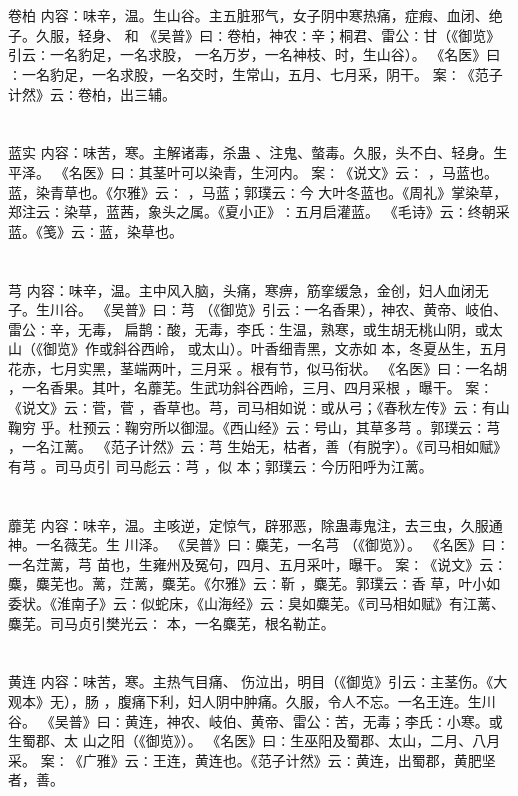 \documentclass[12pt,UTF8]{ctexbook}
\begin{document}
\chapter{}卷柏
内容：味辛，温。生山谷。主五脏邪气，女子阴中寒热痛，症瘕、血闭、绝子。久服，轻身、 
和 
《吴普》曰∶卷柏，神农∶辛；桐君、雷公∶甘（《御览》引云∶一名豹足，一名求股， 
一名万岁，一名神枝、时，生山谷）。 
《名医》曰∶一名豹足，一名求股，一名交时，生常山，五月、七月采，阴干。 
案∶《范子计然》云∶卷柏，出三辅。 


\chapter{}蓝实
内容：味苦，寒。主解诸毒，杀蛊 、注鬼、螫毒。久服，头不白、轻身。生平泽。 
《名医》曰∶其茎叶可以染青，生河内。 
案∶《说文》云∶ ，马蓝也。蓝，染青草也。《尔雅》云∶ ，马蓝；郭璞云∶今 
大叶冬蓝也。《周礼》掌染草，郑注云∶染草，蓝茜，象头之属。《夏小正》∶五月启灌蓝。 
《毛诗》云∶终朝采蓝。《笺》云∶蓝，染草也。 


\chapter{}芎
内容：味辛，温。主中风入脑，头痛，寒痹，筋挛缓急，金创，妇人血闭无子。生川谷。 
《吴普》曰∶芎 （《御览》引云∶一名香果），神农、黄帝、岐伯、雷公∶辛，无毒， 
扁鹊∶酸，无毒，李氏∶生温，熟寒，或生胡无桃山阴，或太山（《御览》作或斜谷西岭， 
或太山）。叶香细青黑，文赤如 本，冬夏丛生，五月花赤，七月实黑，茎端两叶，三月采 
。根有节，似马衔状。 
《名医》曰∶一名胡 ，一名香果。其叶，名蘼芜。生武功斜谷西岭，三月、四月采根 
，曝干。 
案∶《说文》云∶菅，菅 ，香草也。芎，司马相如说∶或从弓；《春秋左传》云∶有山 
鞠穷 
乎。杜预云∶鞠穷所以御湿。《西山经》云∶号山，其草多芎 。郭璞云∶芎 ，一名江蓠。 
《范子计然》云∶芎 生始无，枯者，善（有脱字）。《司马相如赋》有芎 。司马贞引 
司马彪云∶芎 ，似 本；郭璞云∶今历阳呼为江蓠。 


\chapter{}蘼芜
内容：味辛，温。主咳逆，定惊气，辟邪恶，除蛊毒鬼注，去三虫，久服通神。一名薇芜。生 
川泽。 
《吴普》曰∶麋芜，一名芎 （《御览》）。 
《名医》曰∶一名茳蓠，芎 苗也，生雍州及冤句，四月、五月采叶，曝干。 
案∶《说文》云∶麋，麋芜也。蓠，茳蓠，麋芜。《尔雅》云∶靳 ，麋芜。郭璞云∶香 
草，叶小如委状。《淮南子》云∶似蛇床，《山海经》云∶臭如麋芜。《司马相如赋》有江蓠、 
麋芜。司马贞引樊光云∶ 本，一名麋芜，根名勒芷。 


\chapter{}黄连
内容：味苦，寒。主热气目痛、 伤泣出，明目（《御览》引云∶主茎伤。《大观本》无），肠 
，腹痛下利，妇人阴中肿痛。久服，令人不忘。一名王连。生川谷。 
《吴普》曰∶黄连，神农、岐伯、黄帝、雷公∶苦，无毒；李氏∶小寒。或生蜀郡、太 
山之阳（《御览》）。 
《名医》曰∶生巫阳及蜀郡、太山，二月、八月采。 
案∶《广雅》云∶王连，黄连也。《范子计然》云∶黄连，出蜀郡，黄肥坚者，善。 
\end{document}
